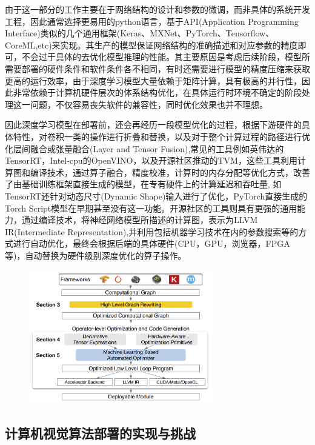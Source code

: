 \documentclass[master,anonymous]{shtthesis}
\begin{document}
由于这一部分的工作主要在于网络结构的设计和参数的微调，而非具体的系统开发工程，因此通常选择更易用的python语言，基于API(Application Programming Interface)类似的几个通用框架(Keras、MXNet、PyTorch、Tensorflow、CoreML,etc)来实现。其生产的模型保证网络结构的准确描述和对应参数的精度即可，不会过于具体的去优化模型推理的性能。其主要原因是考虑后续阶段，模型所需要部署的硬件条件和软件条件各不相同，有时还需要进行模型的精度压缩来获取更高的运行效率，由于深度学习模型大量依赖于矩阵计算，具有极高的并行性，因此非常依赖于计算机硬件层次的体系结构优化，在具体运行时环境不确定的阶段处理这一问题，不仅容易丧失软件的兼容性，同时优化效果也并不理想。

因此深度学习模型在部署前，还会再经历一段模型优化的过程，根据下游硬件的具体特性，对卷积一类的操作进行折叠和替换，以及对于整个计算过程的路径进行优化层间融合或张量融合(Layer and Tensor Fusion),常见的工具例如英伟达的TensorRT，Intel-cpu的OpenVINO，以及开源社区推动的TVM\cite{DBLP:journals/corr/abs-1802-04799}，这些工具利用计算图和编译技术，通过算子融合，精度校准，计算时的内存分配等优化方式，改善了由基础训练框架直接生成的模型，在专有硬件上的计算延迟和吞吐量, 如TensorRT还针对动态尺寸(Dynamic Shape)输入进行了优化，PyTorch直接生成的Torch Script模型\cite{paszke2019pytorch}在早期甚至没有这一功能。开源社区的工具则具有更强的通用能力，通过编译技术，将神经网络模型所描述的计算图，表示为LLVM IR(Intermediate Representation)\cite{lattner2004llvm},并利用包括机器学习技术在内的参数搜索等的方式进行自动优化，最终会根据后端的具体硬件(CPU，GPU，浏览器，FPGA等)，自动替换为硬件级别深度优化的算子操作。

\begin{figure}[htbp]
	\centering
	\includegraphics[width=8cm]{img/3.png}
	\label{TVM架构图}
\end{figure}


\subsection{计算机视觉算法部署的实现与挑战}\label{计算机视觉算法部署的实现与挑战}
\end{document}
